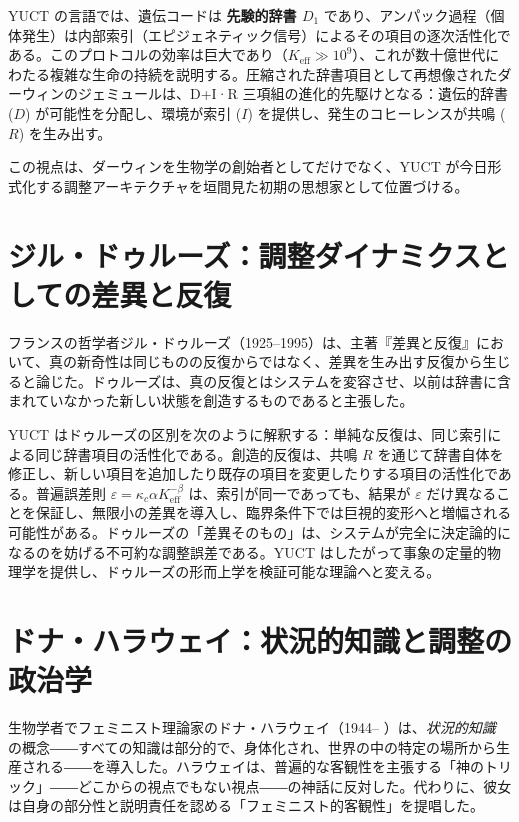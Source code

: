 \documentclass[12pt,a4paper]{article}
\begin{document}
	YUCT の言語では、遺伝コードは \textbf{先験的辞書 \(D_1\)} であり、アンパック過程（個体発生）は内部索引（エピジェネティック信号）によるその項目の逐次活性化である。このプロトコルの効率は巨大であり（\(K_{\mathrm{eff}} \gg 10^9\)）、これが数十億世代にわたる複雑な生命の持続を説明する。圧縮された辞書項目として再想像されたダーウィンのジェミュールは、D+I·R 三項組の進化的先駆けとなる：遺伝的辞書 (\(D\)) が可能性を分配し、環境が索引 (\(I\)) を提供し、発生のコヒーレンスが共鳴 (\(R\)) を生み出す。
	
	この視点は、ダーウィンを生物学の創始者としてだけでなく、YUCT が今日形式化する調整アーキテクチャを垣間見た初期の思想家として位置づける。
	
	\section{ジル・ドゥルーズ：調整ダイナミクスとしての差異と反復}
	
	フランスの哲学者ジル・ドゥルーズ（1925–1995）は、主著『差異と反復』において、真の新奇性は同じものの反復からではなく、差異を生み出す反復から生じると論じた。ドゥルーズは、真の反復とはシステムを変容させ、以前は辞書に含まれていなかった新しい状態を創造するものであると主張した。
	
	YUCT はドゥルーズの区別を次のように解釈する：単純な反復は、同じ索引による同じ辞書項目の活性化である。創造的反復は、共鳴 \(R\) を通じて辞書自体を修正し、新しい項目を追加したり既存の項目を変更したりする項目の活性化である。普遍誤差則 \(\varepsilon = \kappa_c \alpha K_{\mathrm{eff}}^{-\beta}\) は、索引が同一であっても、結果が \(\varepsilon\) だけ異なることを保証し、無限小の差異を導入し、臨界条件下では巨視的変形へと増幅される可能性がある。ドゥルーズの「差異そのもの」は、システムが完全に決定論的になるのを妨げる不可約な調整誤差である。YUCT はしたがって事象の定量的物理学を提供し、ドゥルーズの形而上学を検証可能な理論へと変える。
	
	\section{ドナ・ハラウェイ：状況的知識と調整の政治学}
	
	生物学者でフェミニスト理論家のドナ・ハラウェイ（1944– ）は、\emph{状況的知識} の概念――すべての知識は部分的で、身体化され、世界の中の特定の場所から生産される――を導入した。ハラウェイは、普遍的な客観性を主張する「神のトリック」――どこからの視点でもない視点――の神話に反対した。代わりに、彼女は自身の部分性と説明責任を認める「フェミニスト的客観性」を提唱した。
	
\end{document}
